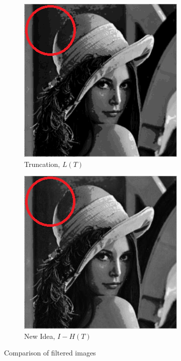 \documentclass{beamer}
\begin{document}
\begin{frame}
\begin{figure}[h]
\begin{subfigure}[b]{0.3\textwidth} \includegraphics[width=\textwidth]{truncation.png} \caption{Truncation, $L(T)$} \end{subfigure}
\begin{subfigure}[b]{0.3\textwidth} \includegraphics[width=\textwidth]{new.png} \caption{New Idea, $I-H(T)$} \end{subfigure}
\caption{Comparison of filtered images}%
\end{figure}

\end{frame}
\end{document}
